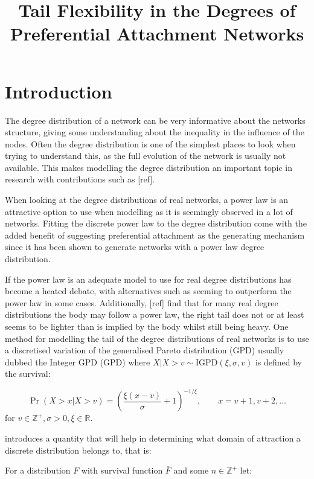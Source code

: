 \documentclass[
  sn-basic,
]{sn-jnl}
\title[Tail Flexibility in the Degrees of Preferential Attachment
Networks]{Tail Flexibility in the Degrees of Preferential Attachment
Networks}
\author[1]{\fnm{Thomas William} \sur{Boughen}}\author[1]{\fnm{Clement} \sur{Lee}}\author[1]{\fnm{Vianey Palacios} \sur{Ramirez}}
\affil[1]{\orgdiv{School of Mathematics, Statistics and
Physics}, \orgname{Newcastle University}}
\theoremstyle{plain}
\theoremstyle{remark}
\begin{document}
\maketitle

\section{Introduction}\label{sec-intro}

The degree distribution of a network can be very informative about the
networks structure, giving some understanding about the inequality in
the influence of the nodes. Often the degree distribution is one of the
simplest places to look when trying to understand this, as the full
evolution of the network is usually not available. This makes modelling
the degree distribution an important topic in research with
contributions such as {[}ref{]}.

When looking at the degree distributions of real networks, a power law
is an attractive option to use when modelling as it is seemingly
observed in a lot of networks. Fitting the discrete power law to the
degree distribution come with the added benefit of suggesting
preferential attachment as the generating mechanism since it has been
shown to generate networks with a power law degree distribution.

If the power law is an adequate model to use for real degree
distributions has become a heated debate, with alternatives such as
\citep{Broido_2019} seeming to outperform the power law in some cases.
Additionally, {[}ref{]} find that for many real degree distributions the
body may follow a power law, the right tail does not or at least seems
to be lighter than is implied by the body whilst still being heavy. One
method for modelling the tail of the degree distributions of real
networks is to use a discretised variation of the generalised Pareto
distribution (GPD) usually dubbed the Integer GPD (GPD) where
\(X|X>v \sim \mathrm{IGPD}(\xi,\sigma,v)\) is defined by the survival:

\[
\Pr(X> x|X> v) = \left(\frac{\xi(x-v)}{\sigma} + 1\right)^{-1/\xi},\qquad x=v+1,v+2,\ldots
\] for \(v\in\mathbb Z^+, \sigma>0,\xi\in \mathbb R\).

\citet{shimura12} introduces a quantity that will help in determining
what domain of attraction a discrete distribution belongs to, that is:

For a distribution \(F\) with survival function \(\bar F\) and some
\(n\in\mathbb Z^+\) let:
\end{document}
